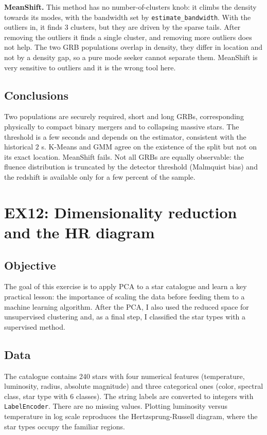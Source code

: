 \documentclass[11pt]{article}
\begin{document}
\textbf{MeanShift.} This method has no number-of-clusters knob: it climbs the density towards its modes, with the bandwidth set by \texttt{estimate\_bandwidth}. With the outliers in, it finds 3 clusters, but they are driven by the sparse tails. After removing the outliers it finds a single cluster, and removing more outliers does not help. The two GRB populations overlap in density, they differ in location and not by a density gap, so a pure mode seeker cannot separate them. MeanShift is very sensitive to outliers and it is the wrong tool here.

\subsection*{Conclusions}

Two populations are securely required, short and long GRBs, corresponding physically to compact binary mergers and to collapsing massive stars. The threshold is a few seconds and depends on the estimator, consistent with the historical $2$ s. K-Means and GMM agree on the existence of the split but not on its exact location. MeanShift fails. Not all GRBs are equally observable: the fluence distribution is truncated by the detector threshold (Malmquist bias) and the redshift is available only for a few percent of the sample.

\section{EX12: Dimensionality reduction and the HR diagram}

\subsection*{Objective}

The goal of this exercise is to apply PCA to a star catalogue and learn a key practical lesson: the importance of scaling the data before feeding them to a machine learning algorithm. After the PCA, I also used the reduced space for unsupervised clustering and, as a final step, I classified the star types with a supervised method.

\subsection*{Data}

The catalogue contains 240 stars with four numerical features (temperature, luminosity, radius, absolute magnitude) and three categorical ones (color, spectral class, star type with 6 classes). The string labels are converted to integers with \texttt{LabelEncoder}. There are no missing values. Plotting luminosity versus temperature in log scale reproduces the Hertzsprung-Russell diagram, where the star types occupy the familiar regions.
\end{document}
